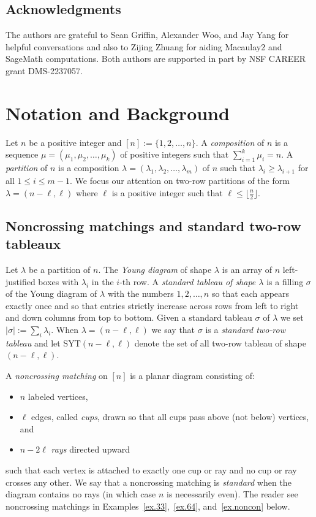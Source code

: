 \documentclass[11pt]{amsart}
\theoremstyle{remark}
\theoremstyle{remark}
\theoremstyle{definition}
\theoremstyle{definition}
\theoremstyle{definition}
\numberwithin{equation}{section}
\newcommand{\gs}{\sigma}
\newcommand{\SYT}{\mathrm{SYT}}
\begin{document}
\subsection*{Acknowledgments} The authors are grateful to Sean Griffin, Alexander Woo, and Jay Yang for helpful conversations and also to Zijing Zhuang for aiding Macaulay2 and SageMath computations. Both authors are supported in part by NSF CAREER grant DMS-2237057.



\section{Notation and Background}\label{sec:notback}
Let $n$ be a positive integer and $[n]:=\{1,2,\ldots, n\}$. A \emph{composition} of $n$ is a sequence $\mu = (\mu_1, \mu_2, \ldots, \mu_k)$ of positive integers such that  $\sum_{i=1}^k \mu_i =n $.   A \emph{partition} of $n$ is a composition $\lambda=(\lambda_1, \lambda_2, \ldots, \lambda_m)$ of $n$ such that $\lambda_i \geq \lambda_{i+1}$ for all $1\leq i\leq m-1$.  We focus our attention on two-row partitions of the form $\lambda = (n-\ell, \ell)$ where $\ell$ is a positive integer such that $\ell\leq \lfloor\frac{n}{2}\rfloor$.  





\subsection{Noncrossing matchings and standard two-row tableaux}  

Let $\lambda$ be a partition of $n$. The \emph{Young diagram} of shape $\lambda$ is an array of $n$ left-justified boxes with $\lambda_i$ in the $i$-th row.  A \emph{standard tableau of shape $\lambda$} is a filling $\gs$ of the Young diagram of $\lambda$ with the numbers $1,2,\ldots, n$ so that each appears exactly once and so that entries strictly increase across rows from left to right and down columns from top to bottom. Given a standard tableau $\gs$ of $\lambda$ we set $|\gs|:=\sum_{i}\lambda_i$.  When $\lambda= (n-\ell, \ell)$ we say that $\sigma$ is a \emph{standard two-row tableau} and let $\SYT(n-\ell, \ell)$ denote the set of all two-row tableau of shape $(n-\ell, \ell)$. 

A \emph{noncrossing matching} on $[n]$ is a planar diagram consisting of:
\begin{itemize}
\item $n$ labeled vertices,
\item $\ell$ edges, called \emph{cups}, drawn so that all cups pass above (not below) vertices, and 
\item $n-2\ell$ \emph{rays} directed upward
\end{itemize}
such that each vertex is attached to exactly one cup or ray and no cup or ray crosses any other. We say that a noncrossing matching is \emph{standard} when the diagram contains no rays (in which case $n$ is necessarily even).  The reader see noncrossing matchings in Examples~\ref{ex.33},~\ref{ex.64}, and~\ref{ex.noncon} below.
\end{document}
